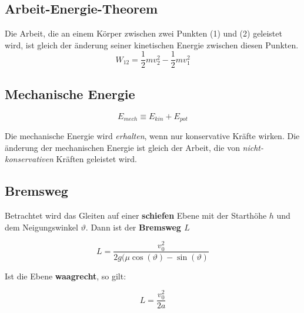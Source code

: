 \documentclass[7pt]{article}
\begin{document}
\begin{multicols*}{3}
\subsection{Arbeit-Energie-Theorem}

Die Arbeit, die an einem K{\"o}rper zwischen zwei Punkten (1) und (2) geleistet wird, ist gleich der {\"a}nderung seiner kinetischen Energie zwischen diesen Punkten.
\begin{equation*}
	W_{12} = \frac{1}{2}mv_2^2 - \frac{1}{2}mv_1^2
\end{equation*}

\subsection{Mechanische Energie}

\begin{equation*}
	E_{mech} \equiv E_{kin} + E_{pot}
\end{equation*}

Die mechanische Energie wird \emph{erhalten}, wenn nur konservative Kr{\"a}fte wirken. \newline
Die {\"a}nderung der mechanischen Energie ist gleich der Arbeit, die von \emph{nicht-konservativen} Kr{\"a}ften geleistet wird.

\subsection{Bremsweg}

Betrachtet wird das Gleiten auf einer \textbf{schiefen} Ebene mit der Starth{\"o}he $h$ und dem Neigungswinkel $\vartheta$. Dann ist der \textbf{Bremsweg $L$}

\begin{equation*}
	L = \frac{v_0^2}{2g(\mu\cos(\vartheta) - \sin(\vartheta)}
\end{equation*}

Ist die Ebene \textbf{waagrecht}, so gilt:

\begin{equation*}
	L = \frac{v_0^2}{2a}
\end{equation*}

\end{multicols*}
\end{document}

